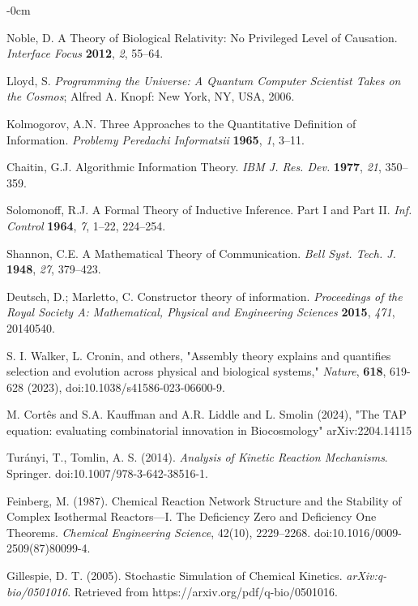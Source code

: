 \documentclass[entropy,article,submit,pdftex,moreauthors]{Definitions/mdpi}
\begin{document}
\begin{adjustwidth}{-\extralength}{0cm}
\begin{thebibliography}{999}
Noble, D. A Theory of Biological Relativity: No Privileged Level of Causation. \textit{Interface Focus} \textbf{2012}, \textit{2}, 55–64.

Lloyd, S. \textit{Programming the Universe: A Quantum Computer Scientist Takes on the Cosmos}; Alfred A. Knopf: New York, NY, USA, 2006.

Kolmogorov, A.N. Three Approaches to the Quantitative Definition of Information. \textit{Problemy Peredachi Informatsii} \textbf{1965}, \textit{1}, 3–11.

Chaitin, G.J. Algorithmic Information Theory. \textit{IBM J. Res. Dev.} \textbf{1977}, \textit{21}, 350–359. 

Solomonoff, R.J. A Formal Theory of Inductive Inference. Part I and Part II. \textit{Inf. Control} \textbf{1964}, \textit{7}, 1–22, 224–254.

Shannon, C.E. A Mathematical Theory of Communication. \textit{Bell Syst. Tech. J.} \textbf{1948}, \textit{27}, 379–423.

Deutsch, D.; Marletto, C. Constructor theory of information. \textit{Proceedings of the Royal Society A: Mathematical, Physical and Engineering Sciences} \textbf{2015}, \textit{471}, 20140540. 

S. I. Walker, L. Cronin, and others,
"Assembly theory explains and quantifies selection and evolution across physical and biological systems," \textit{Nature}, \textbf{618}, 619-628 (2023), doi:10.1038/s41586-023-06600-9.

M. Cortês and S.A. Kauffman and A.R. Liddle and L. Smolin (2024), "The TAP equation: evaluating combinatorial innovation in Biocosmology" arXiv:2204.14115


Turányi, T., Tomlin, A. S. (2014). \textit{Analysis of Kinetic Reaction Mechanisms}. Springer. doi:10.1007/978-3-642-38516-1.

Feinberg, M. (1987). Chemical Reaction Network Structure and the Stability of Complex Isothermal Reactors—I. The Deficiency Zero and Deficiency One Theorems. \textit{Chemical Engineering Science}, 42(10), 2229–2268. doi:10.1016/0009-2509(87)80099-4.

Gillespie, D. T. (2005). Stochastic Simulation of Chemical Kinetics. \textit{arXiv:q-bio/0501016}. Retrieved from https://arxiv.org/pdf/q-bio/0501016.


\end{thebibliography}
\end{adjustwidth}
\end{document}
